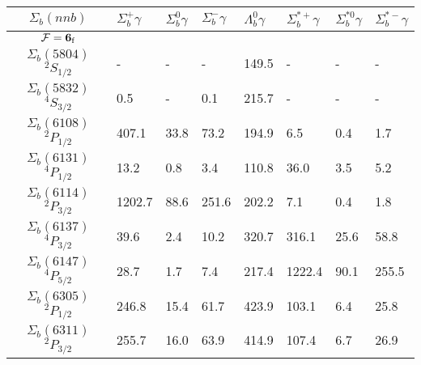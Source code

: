 \begin{tabular}{c |  p{0.65cm}  p{0.65cm}  p{0.65cm}  p{0.65cm}  p{0.65cm}  p{0.65cm}  p{0.65cm}} \hline \hline
$\Sigma_b(nnb)$  & $\Sigma_{b}^{+} \gamma$  & $\Sigma_{b}^{0} \gamma$  & $\Sigma_{b}^{-} \gamma$  & $\Lambda_{b}^{0} \gamma$  & $\Sigma_{b}^{*+} \gamma$  & $\Sigma_{b}^{*0} \gamma$  & $\Sigma_{b}^{*-} \gamma$  \\ \hline
$\mathcal{F}={\bf {6}}_{\rm f}$ &&&&&&&\\ \hline
$\Sigma_b(5804)$ $^{2}S_{1/2}$&-  &-  &-  &149.5  &-  &-  &- \\
$\Sigma_b(5832)$ $^{4}S_{3/2}$&0.5  &-  &0.1  &215.7  &-  &-  &- \\
$\Sigma_b(6108)$ $^{2}P_{1/2}$&407.1  &33.8  &73.2  &194.9  &6.5  &0.4  &1.7 \\
$\Sigma_b(6131)$ $^{4}P_{1/2}$&13.2  &0.8  &3.4  &110.8  &36.0  &3.5  &5.2 \\
$\Sigma_b(6114)$ $^{2}P_{3/2}$&1202.7  &88.6  &251.6  &202.2  &7.1  &0.4  &1.8 \\
$\Sigma_b(6137)$ $^{4}P_{3/2}$&39.6  &2.4  &10.2  &320.7  &316.1  &25.6  &58.8 \\
$\Sigma_b(6147)$ $^{4}P_{5/2}$&28.7  &1.7  &7.4  &217.4  &1222.4  &90.1  &255.5 \\
$\Sigma_b(6305)$ $^{2}P_{1/2}$&246.8  &15.4  &61.7  &423.9  &103.1  &6.4  &25.8 \\
$\Sigma_b(6311)$ $^{2}P_{3/2}$&255.7  &16.0  &63.9  &414.9  &107.4  &6.7  &26.9 \\
\hline \hline
\end{tabular}
